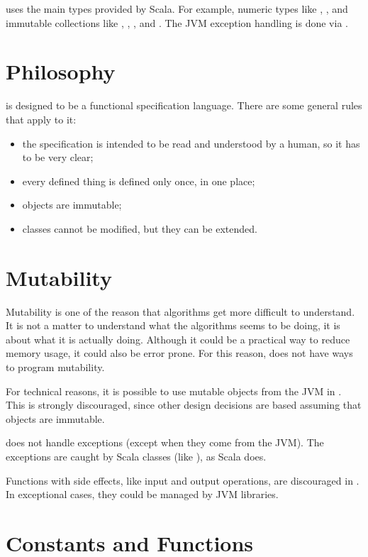 \Soda uses the main types provided by Scala.
For example, numeric types like , , and immutable collections like , , , and .
The JVM exception handling is done via .


\section{Philosophy}

\Soda is designed to be a functional specification language.
There are some general rules that apply to it:

\begin{itemize}
    \item the specification is intended to be read and understood by a human, so it has to be very clear;
    \item every defined thing is defined only once, in one place;
    \item objects are immutable;
    \item classes cannot be modified, but they can be extended.
\end{itemize}


\section{Mutability}

Mutability is one of the reason that algorithms get more difficult to understand.
It is not a matter to understand what the algorithms seems to be doing, it is about what it is actually doing.
Although it could be a practical way to reduce memory usage, it could also be error prone.
For this reason, \Soda does not have ways to program mutability.

For technical reasons, it is possible to use mutable objects from the JVM in \Soda.
This is strongly discouraged, since other design decisions are based assuming that objects are immutable.

\Soda does not handle exceptions (except when they come from the JVM).
The exceptions are caught by Scala classes (like ), as Scala does.

Functions with side effects, like input and output operations, are discouraged in \Soda.
In exceptional cases, they could be managed by JVM libraries.


\section{Constants and Functions}

